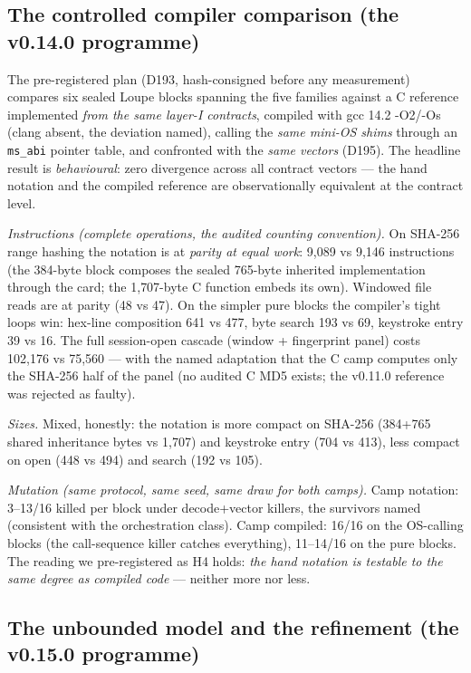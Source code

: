 \documentclass[11pt,a4paper]{article}
\newcommand{\code}[1]{\texttt{\small #1}}
\begin{document}
\subsection{The controlled compiler comparison (the v0.14.0 programme)}\label{sec:comparaison}

The pre-registered plan (D193, hash-consigned before any measurement)
compares six sealed Loupe blocks spanning the five families against a C
reference implemented \emph{from the same layer-I contracts}, compiled
with gcc 14.2 -O2/-Os (clang absent, the deviation named), calling the
\emph{same mini-OS shims} through an \code{ms\_abi} pointer table, and
confronted with the \emph{same vectors} (D195). The headline result is
\emph{behavioural}: zero divergence across all contract vectors ---
the hand notation and the compiled reference are observationally
equivalent at the contract level.

\emph{Instructions (complete operations, the audited counting convention).}
On SHA-256 range hashing the notation is at \emph{parity at equal work}:
9{,}089 vs 9{,}146 instructions (the 384-byte block composes the sealed
765-byte inherited implementation through the card; the 1{,}707-byte C
function embeds its own). Windowed file reads are at parity (48 vs 47). On
the simpler pure blocks the compiler's tight loops win: hex-line
composition 641 vs 477, byte search 193 vs 69, keystroke entry 39 vs 16.
The full session-open cascade (window + fingerprint panel) costs 102{,}176
vs 75{,}560 --- with the named adaptation that the C camp computes only
the SHA-256 half of the panel (no audited C MD5 exists; the v0.11.0
reference was rejected as faulty).

\emph{Sizes.} Mixed, honestly: the notation is more compact on
SHA-256 (384+765 shared inheritance bytes vs 1{,}707) and keystroke
entry (704 vs 413), less compact on open (448 vs 494) and search (192
vs 105).

\emph{Mutation (same protocol, same seed, same draw for both camps).}
Camp notation: 3--13/16 killed per block under decode+vector killers,
the survivors named (consistent with the orchestration class). Camp
compiled: 16/16 on the OS-calling blocks (the call-sequence killer
catches everything), 11--14/16 on the pure blocks. The reading we
pre-registered as H4 holds: \emph{the hand notation is testable to the
same degree as compiled code} --- neither more nor less.


\subsection{The unbounded model and the refinement (the v0.15.0
programme)}\label{sec:v150}
\end{document}

